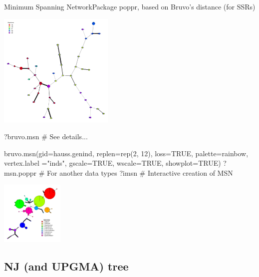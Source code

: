 \documentclass[compress, ucs, xelatex, 11pt, xcolor=svgnames,
  hyperref={
    bookmarks=true,
    unicode=true,
    colorlinks=true,
    pdftitle={Molecular data in R},
    plainpages=false,
    pdfauthor={Vojtech Zeisek},
    pdfsubject={Course about phylogeny and evolution in R},
    pdfcreator={XeLaTeX},
    pdfkeywords={R, evolution, phylogeny, molecular data},
    linkcolor=Tomato,
    anchorcolor=SaddleBrown,
    citecolor=Goldenrod,
    filecolor=DarkMagenta,
    menucolor=Sienna,
    urlcolor=DarkTurquoise,
    pdftex},
  url={hyphens, lowtilde} %
  ]{beamer}
\begin{document}
\begin{frame}[fragile]{Minimum Spanning Network}{Package poppr, based on Bruvo's distance (for SSRs)}
\label{MSN}
\begin{multicols}{2}
  \begin{center}
    \includegraphics[height=5.5cm]{msn.png}
  \end{center}
  \begin{spluscode}
    ?bruvo.msn # See details...
  \end{spluscode}
  \columnbreak
  \begin{spluscode}
    bruvo.msn(gid=hauss.genind,
      replen=rep(2, 12), loss=TRUE,
      palette=rainbow, vertex.label
      ="inds", gscale=TRUE,
      wscale=TRUE, showplot=TRUE)
    ?msn.poppr # For another data types
    ?imsn # Interactive creation of MSN
  \end{spluscode}
  \begin{center}
    \includegraphics[width=3cm]{msn-bruvo_no_labels.png}
  \end{center}
\end{multicols}
\end{frame}

\subsection{NJ (and UPGMA) tree}
\end{document}
